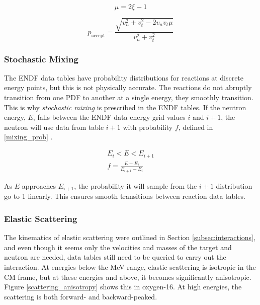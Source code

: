 \begin{equation}
\label{mu_samp}
\mu = 2\xi - 1 
\end{equation}

\begin{equation}
\label{prob_accept}
p_\mathrm{accept} = \frac{\sqrt{v_n^2+v_t^2-2 v_n v_t \mu}}{v_n^2+v_t^2}
\end{equation}

\subsubsection{Stochastic Mixing}

The ENDF data tables have probability distributions for reactions at discrete energy points, but this is not physically accurate.  The reactions do not abruptly transition from one PDF to another at a single energy, they smoothly transition.  This is why \emph{stochastic mixing} is prescribed in the ENDF tables.  If the neutron energy, $E$, falls between the ENDF data energy grid values $i$ and $i+1$, the neutron will use data from table $i+1$ with probability $f$, defined in \eqref{mixing_prob} \cite{openmc}.

\begin{equation}
\label{mixing_prob}
\begin{gathered}
E_i < E < E_{i+1} \\
f = \frac{E-E_i}{E_{i+1}-E_i}
\end{gathered}
\end{equation}

As $E$ approaches $E_{i+1}$, the probability it will sample from the $i+1$ distribution go to 1 linearly.  This ensures smooth transitions between reaction data tables.


\subsubsection{Elastic Scattering}

The kinematics of elastic scattering were outlined in Section \ref{subsec:interactions}, and even though it seems only the velocities and masses of the target and neutron are needed, data tables still need to be queried to carry out the interaction.  At energies below the MeV range, elastic scattering is isotropic in the CM frame, but at these energies and above, it becomes significantly anisotropic.  Figure \ref{scattering_anisotropy} shows this in oxygen-16.  At high energies, the scattering is both forward- and backward-peaked.  


